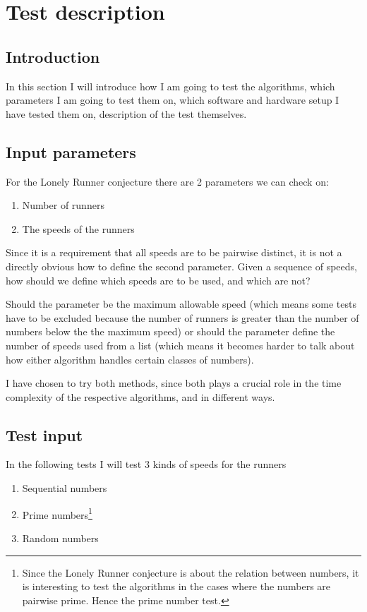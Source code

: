 \section{Test description}
\label{test}

\subsection{Introduction}
In this section I will introduce how I am going to test the algorithms, which parameters I am going to test them on, which software and hardware setup I have tested them on, description of the test themselves.

\subsection{Input parameters}
For the Lonely Runner conjecture there are 2 parameters we can check
on:
\begin{enumerate}
\item Number of runners
\item The speeds of the runners
\end{enumerate}

Since it is a requirement that all speeds are to be pairwise distinct,
it is not a directly obvious how to define the second
parameter. Given a sequence of speeds, how should we define which
speeds are to be used, and which are not? 

Should the parameter be the maximum allowable speed (which means some tests have to be
excluded because the number of runners is greater than the number of numbers below the the maximum speed) or should the parameter define the number of speeds used from a list (which means it becomes
harder to talk about how either algorithm handles certain classes of
numbers).

I have chosen to try both methods, since both plays a crucial role in
the time complexity of the respective algorithms, and in different ways.

\subsection{Test input}
In the following tests I will test 3 kinds of speeds for the runners
\begin{enumerate}
\item Sequential numbers
\item Prime numbers\footnote{Since the Lonely Runner conjecture is about the relation between numbers, it is interesting to test the algorithms in the cases where the numbers are pairwise prime. Hence the prime number test.}
\item Random numbers
\end{enumerate}

